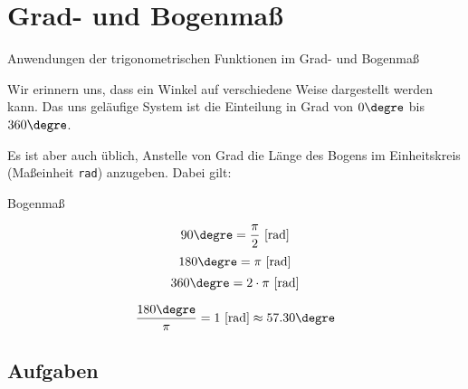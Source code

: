 
\section{Grad- und Bogenmaß}

Anwendungen der trigonometrischen Funktionen im Grad- und Bogenmaß

Wir erinnern uns, dass ein Winkel auf verschiedene Weise dargestellt
werden kann. Das uns geläufige System ist die Einteilung in Grad von
$0\degre$ bis $360\degre$.

Es ist aber auch üblich, Anstelle von Grad die Länge des Bogens im
Einheitskreis (Maßeinheit \texttt{rad}) anzugeben. Dabei gilt:

\begin{gesetz}{Bogenmaß}{}
  
  $$90\degre=\frac{\pi}2 \text{ [rad]}$$
  $$180\degre=\pi\text{ [rad]}$$
  $$360\degre=2\cdot{}\pi \text{ [rad]}$$

  $$\frac{180\degre}{\pi}  =1 \text{ [rad]} \approx{} 57.30\degre$$
  
\end{gesetz}

\subsection*{Aufgaben}


\newpage
